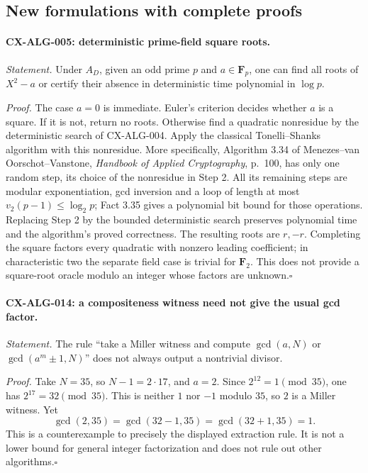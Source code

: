 \documentclass[11pt,a4paper]{article}
\begin{document}
\subsection{New formulations with complete proofs}

\paragraph{CX-ALG-005: deterministic prime-field square roots.}
\emph{Statement.} Under $A_D$, given an odd prime $p$ and $a\in\mathbf F_p$,
one can find all roots of $X^2-a$ or certify their absence in deterministic
time polynomial in $\log p$.

\emph{Proof.} The case $a=0$ is immediate. Euler's criterion decides whether
$a$ is a square. If it is not, return no roots. Otherwise find a quadratic
nonresidue by the deterministic search of CX-ALG-004. Apply the classical
Tonelli--Shanks algorithm with this nonresidue. More specifically, Algorithm
3.34 of Menezes--van Oorschot--Vanstone, \emph{Handbook of Applied Cryptography},
p.~100, has only one random step, its choice of the nonresidue in Step 2.
All its remaining steps are modular exponentiation, gcd inversion and a
loop of length at most $v_2(p-1)\leq\log_2p$; Fact 3.35 gives a polynomial
bit bound for those operations. Replacing Step 2 by the bounded deterministic
search preserves polynomial time and the algorithm's proved correctness.
The resulting roots are $r,-r$. Completing the square factors every quadratic
with nonzero leading coefficient; in characteristic two the separate field
case is trivial for $\mathbf F_2$. This does not provide a square-root oracle
modulo an integer whose factors are unknown.\hfill$\square$

\paragraph{CX-ALG-014: a compositeness witness need not give the usual gcd factor.}
\emph{Statement.} The rule ``take a Miller witness and compute
$\gcd(a,N)$ or $\gcd(a^m\pm1,N)$'' does not always output a nontrivial divisor.

\emph{Proof.} Take $N=35$, so $N-1=2\cdot17$, and $a=2$. Since
$2^{12}=1\pmod{35}$, one has $2^{17}=32\pmod{35}$. This is neither $1$ nor
$-1$ modulo $35$, so $2$ is a Miller witness. Yet
\[
 \gcd(2,35)=\gcd(32-1,35)=\gcd(32+1,35)=1.
\]
This is a counterexample to precisely the displayed extraction rule.
It is not a lower bound for general integer factorization and does not
rule out other algorithms.\hfill$\square$
\end{document}
